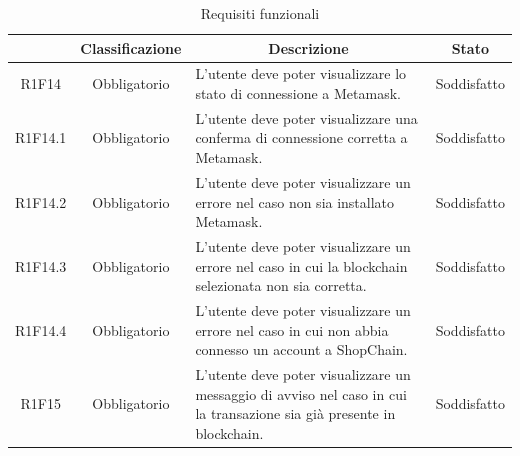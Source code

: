 \begin{table}[H]
    \centering
    \renewcommand{\arraystretch}{1.8}
    \begin{tabular}{c | c | p{6cm} | c}
        \rowcolor[HTML]{125E28}
        \multicolumn{1}{c}{\color[HTML]{FFFFFF} \textbf{Codice}}          &
        \multicolumn{1}{c}{\color[HTML]{FFFFFF} \textbf{Classificazione}} &
        \multicolumn{1}{c}{\color[HTML]{FFFFFF} \textbf{Descrizione}}     &
        \multicolumn{1}{c}{\color[HTML]{FFFFFF} \textbf{Stato}}                                                                                                                                                                   \\
        \hline
        R1F14                                                             & Obbligatorio & L'utente deve poter visualizzare lo stato di connessione a Metamask\glo{}.                                       &Soddisfatto                      \\
        R1F14.1                                                           & Obbligatorio & L'utente deve poter visualizzare una conferma di connessione corretta a Metamask\glo{}.                      & Soddisfatto                     \\
        R1F14.2                                                           & Obbligatorio & L'utente deve poter visualizzare un errore nel caso non sia installato Metamask\glo{}.                                             & Soddisfatto   \\
        R1F14.3                                                           & Obbligatorio & L'utente deve poter visualizzare un errore nel caso in cui la blockchain selezionata non sia corretta.                       & Soddisfatto   \\
        R1F14.4                                                           & Obbligatorio & L'utente deve poter visualizzare un errore nel caso in cui non abbia connesso un account a ShopChain.                        & Soddisfatto   \\
        R1F15                                                             & Obbligatorio & L'utente deve poter visualizzare un messaggio di avviso nel caso in cui la transazione sia già presente in blockchain\glo{}. & Soddisfatto \\
    \end{tabular}
    \caption{Requisiti funzionali}
\end{table}


